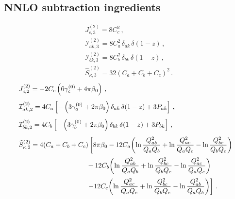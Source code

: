 \subsection{NNLO subtraction ingredients}
\begin{subequations}
\label{eq:C23-ingred}
\begin{align}
&J_{c,3}^{(2)} = 8C_c^2\,, \\[1ex]
&\mathcal{I}_{ak,3}^{(2)} = 8C_a^2\,\delta_{ak}\,\delta(1-z)\,, \\[1ex]
&\mathcal{I}_{bk,3}^{(2)} = 8C_b^2\,\delta_{bk}\,\delta(1-z)\,, \\[1ex]
&\widehat{S}_{\kappa,3}^{(2)} = 32\left(C_a+C_b+C_c\right)^2\,.
\end{align}
\end{subequations}
\begin{subequations}
\label{eq:C22-ingred}
\begin{align}
&J_{c,2}^{(2)} = -2C_c\left(6\gamma_c^{(0)}+4\pi\beta_0\right)\,, \\[1ex]
&\mathcal{I}_{ak,2}^{(2)} = 4C_a\left[
    -\left(3\gamma_a^{(0)}+2\pi\beta_0\right)\delta_{ak}\,\delta(1-z)
    +3P_{ak}\right]\,, \\[1ex]
&\mathcal{I}_{bk,2}^{(2)} = 4C_b\left[
    -\left(3\gamma_b^{(0)}+2\pi\beta_0\right)\delta_{bk}\,\delta(1-z)
    +3P_{bk}\right]\,, \\[1ex]
&\widehat{S}_{\kappa,2}^{(2)} =
    4(C_a+C_b+C_c)\left[8\pi\beta_0-12C_a\!\left(\ln\frac{Q_{ab}^2}{Q_a Q_b}
    +\ln\frac{Q_{ac}^2}{Q_a Q_c}-\ln\frac{Q_{bc}^2}{Q_b Q_c}\right)\right. \notag\\[0.5ex]
  &\qquad\qquad\qquad\qquad\qquad-12C_b\!\left(\ln\frac{Q_{ab}^2}{Q_a Q_b}\notag
      +\ln\frac{Q_{bc}^2}{Q_b Q_c}-\ln\frac{Q_{ac}^2}{Q_a Q_c}\right) \notag\\[0.5ex]
  &\left.\qquad\qquad\qquad\qquad\qquad-12C_c\!\left(\ln\frac{Q_{ac}^2}{Q_a Q_c}
    +\ln\frac{Q_{bc}^2}{Q_b Q_c}-\ln\frac{Q_{ab}^2}{Q_a Q_b}\right)\right]\,.
\end{align}
\end{subequations}

